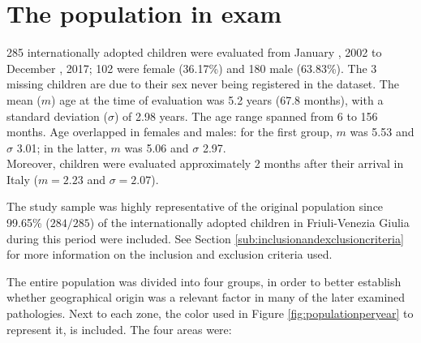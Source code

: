 \section{The population in exam}\label{sec:thepopulationinexam}
285 internationally adopted children were evaluated from January , 2002 to December , 2017; 102 were female (36.17\%) and 180 male (63.83\%). The 3 missing children are due to their sex never being registered in the dataset. The mean ($m$) age at the time of evaluation was 5.2 years (67.8 months), with a standard deviation ($\sigma$) of 2.98 years. The age range spanned from 6 to 156 months. Age overlapped in females and males: for the first group, $m$ was 5.53 and $\sigma$ 3.01; in the latter, $m$ was 5.06 and $\sigma$ 2.97.\\
Moreover, children were evaluated approximately 2 months after their arrival in Italy ($m = 2.23$ and $\sigma = 2.07$).

The study sample was highly representative of the original population since 99.65\% ($284/285$) of the internationally adopted children in Friuli-Venezia Giulia during this period were included. See Section \ref{sub:inclusionandexclusioncriteria} for more information on the inclusion and exclusion criteria used.

The entire population was divided into four groups, in order to better establish whether geographical origin was a relevant factor in many of the later examined pathologies. Next to each zone, the color used in Figure \ref{fig:populationperyear} to represent it, is included. The four areas were:

